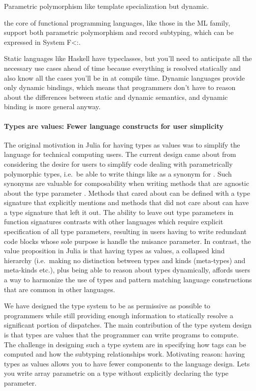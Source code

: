 \documentclass[pldi]{sigplanconf-pldi15}
\begin{document}
Parametric polymorphism like template specialization but dynamic.

the core of functional programming languages, like those in the ML family, support both parametric polymorphism and record subtyping, which can be expressed in System F<:.

Static languages like Haskell have typeclasses\cite{typeclass}, but you'll need
to anticipate all the necessary use cases ahead of time because everything is
resolved statically and also know all the cases you'll be in at compile time.
Dynamic languages provide only dynamic bindings, which means that programmers
don't have to reason about the differences between static and dynamic
semantics, and dynamic binding is more general anyway.

\paragraph{Types are values: Fewer language constructs for user simplicity}
The original motivation in Julia for having types as values was to simplify the
language for technical computing users.  The current design came about from
considering the desire for users to simplify code dealing with parametrically
polymorphic types, i.e.\ be able to write things like  as a synonym
for .  Such synonyms are valuable for composability when
writing methods that are agnostic about the type parameter .  Methods
that cared about  can be defined with a type signature that explicitly
mentions  and methods that did not care about  can have a type
signature that left it out.  The ability to leave out type parameters in
function signatures contrasts with other languages  which
require explicit specification of all type parameters, resulting in users
having to write redundant code blocks whose sole purpose is handle the nuisance
parameter.  In contrast, the value proposition in Julia is that having types as
values, a collapsed kind hierarchy (i.e.\ making no distinction between types
and kinds (meta-types) and meta-kinds etc.), plus being able to reason about
types dynamically, affords users a way to harmonize the use of types and
pattern matching language constructions that are common in other languages.

We have designed the type system to be as permissive as possible to programmers
while still providing enough information to statically resolve a significant
portion of dispatches. The main contribution of the type system design is that
types are values that the programmer can write programs to compute. The
challenge in designing such a type system are in specifying how tags can be
computed and how the subtyping relationships work.  Motivating reason: having
types as values allows you to have fewer components to the language design.
Lets you write array parametric on a type without explicitly declaring the type
parameter.
\end{document}
